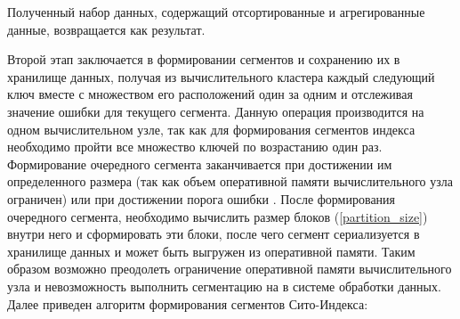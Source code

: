 Полученный набор данных, содержащий отсортированные и агрегированные данные, возвращается как результат.

Второй этап заключается в формировании сегментов и сохранению их в хранилище данных, получая из вычислительного кластера каждый следующий ключ вместе с множеством его расположений один за одним и отслеживая значение ошибки для текущего сегмента. Данную операция производится на одном вычислительном узле, так как для формирования сегментов индекса необходимо пройти все множество ключей по возрастанию один раз. Формирование очередного сегмента заканчивается при достижении им определенного размера (так как объем оперативной памяти вычислительного узла ограничен) или при достижении порога ошибки . После формирования очередного сегмента, необходимо вычислить размер блоков (\ref{partition_size}) внутри него и сформировать эти блоки, после чего сегмент сериализуется в хранилище данных и может быть выгружен из оперативной памяти. Таким образом возможно преодолеть ограничение оперативной памяти вычислительного узла и невозможность выполнить сегментацию на в системе обработки данных. Далее приведен алгоритм формирования сегментов Сито-Индекса:

